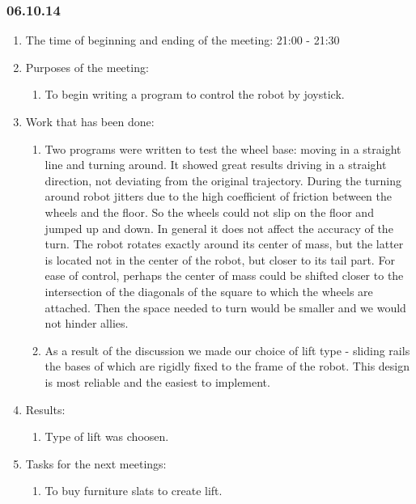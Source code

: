 \subsubsection{06.10.14}

\begin{enumerate}
	\item The time of beginning and ending of the meeting:
	21:00 - 21:30
	\item Purposes of the meeting:
	\begin{enumerate}
		\item To begin writing a program to control the robot by joystick.
		
	\end{enumerate}
	\item Work that has been done:
	\begin{enumerate}
		\item Two programs were written to test the wheel base: moving in a straight line and turning around. It showed great results driving in a straight direction, not deviating from the original trajectory. During the turning around robot jitters due to the high coefficient of friction between the wheels and the floor. So the wheels could not slip on the floor and jumped up and down. In general it does not affect the accuracy of the turn. The robot rotates exactly around its center of mass, but the latter is located not in the center of the robot, but closer to its tail part. For ease of control, perhaps the center of mass could be shifted closer to the intersection of the diagonals of the square to which the wheels are attached. Then the space needed to turn would be smaller and we would not hinder allies. 
		
		\item  As a result of the discussion we made our choice of lift type - sliding rails the bases of which are rigidly fixed to the frame of the robot. This design is most reliable and the easiest to implement.
		
	\end{enumerate}
	
	\item Results: 
	\begin{enumerate}
		\item  Type of lift was choosen.
		
	\end{enumerate}
	
	\item Tasks for the next meetings:
	\begin{enumerate}
		\item To buy furniture slats to create lift.
		
	\end{enumerate}     
\end{enumerate}
\fillpage